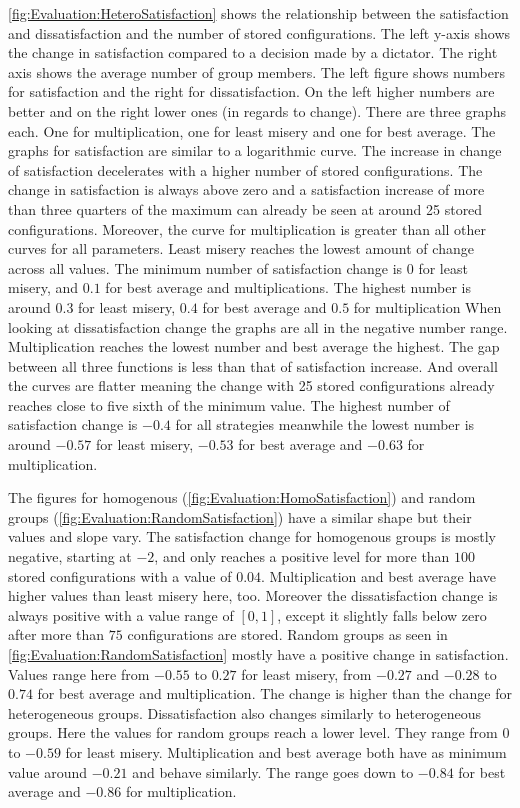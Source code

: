 \autoref{fig:Evaluation:HeteroSatisfaction} shows the relationship between the satisfaction and dissatisfaction and the number of stored configurations. The left y-axis shows the change in satisfaction compared to a decision made by a dictator. The right axis shows the average number of group members. The left figure shows numbers for satisfaction and the right for dissatisfaction. On the left higher numbers are better and on the right lower ones (in regards to change). There are three graphs each. One for multiplication, one for least misery and one for best average. The graphs for satisfaction are similar to a logarithmic curve. The increase in change of satisfaction decelerates with a higher number of stored configurations. The change in satisfaction is always above zero and a satisfaction increase of more than three quarters of the maximum can already be seen at around 25 stored configurations. Moreover, the curve for multiplication is greater than all other curves for all parameters. Least misery reaches the lowest amount of change across all values. The minimum number of satisfaction change is $0$ for least misery, and $0.1$ for best average and multiplications. The highest number is around $0.3$ for least misery, $0.4$ for best average and $0.5$ for multiplication
When looking at dissatisfaction change the graphs are all in the negative number range. Multiplication reaches the lowest number and best average the highest. The gap between all three functions is less than that of satisfaction increase. And overall the curves are flatter meaning the change with 25 stored configurations already reaches close to five sixth of the minimum value. The highest number of satisfaction change is $-0.4$ for all strategies meanwhile the lowest number is around $-0.57$ for least misery, $-0.53$ for best average and $-0.63$ for multiplication.

The figures for homogenous (\autoref{fig:Evaluation:HomoSatisfaction}) and random groups (\autoref{fig:Evaluation:RandomSatisfaction}) have a similar shape but their values and slope vary. The satisfaction change for homogenous groups is mostly negative, starting at $-2$, and only reaches a positive level for more than $100$ stored configurations with a value of $0.04$. Multiplication and best average have higher values than least misery here, too. Moreover the dissatisfaction change is always positive with a value range of $[0,1]$, except it slightly falls below zero after more than $75$ configurations are stored.
Random groups as seen in \autoref{fig:Evaluation:RandomSatisfaction} mostly have a positive change in satisfaction. Values range here from $-0.55$ to $0.27$ for least misery, from $-0.27$ and $-0.28$ to $0.74$ for best average and multiplication. The change is higher than the change for heterogeneous groups. Dissatisfaction also changes similarly to heterogeneous groups. Here the values for random groups reach a lower level. They range from $0$ to $-0.59$ for least misery. Multiplication and best average both have as minimum value around $-0.21$ and behave similarly. The range goes down to $-0.84$ for best average and $-0.86$ for multiplication.

